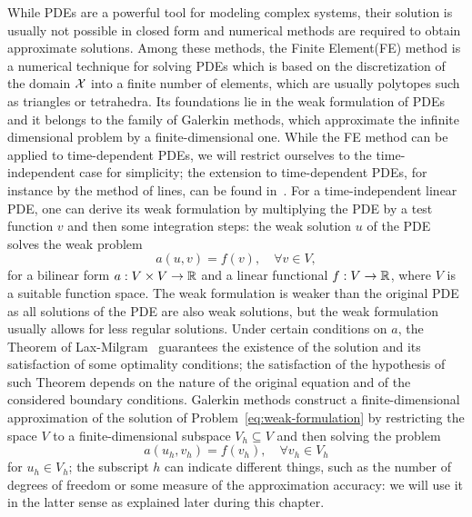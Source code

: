 While PDEs are a powerful tool for modeling complex systems, their solution is usually not possible in closed form and numerical methods are required to obtain approximate solutions.
Among these methods, the Finite Element(FE) method is a numerical technique for solving PDEs which is based on the discretization of the domain $\mathcal X$ into a finite number of elements, which are usually polytopes such as triangles or tetrahedra.
Its foundations lie in the weak formulation of PDEs and it belongs to the family of Galerkin methods, which approximate the infinite dimensional problem by a finite-dimensional one.
While the FE method can be applied to time-dependent PDEs, we will restrict ourselves to the time-independent case for simplicity; the extension to time-dependent PDEs, for instance by the method of lines, can be found in~\cite[Chapter 9]{DeuflhardWeiser2012}. \newline
For a time-independent linear PDE, one can derive its weak formulation by multiplying the PDE by a test function $v$ and then some integration steps: the weak solution $u$ of the PDE solves the weak problem 
\begin{equation}\label{eq:weak-formulation}
    a(u,v) = f(v), \quad \forall v \in V,
\end{equation}
for a bilinear form $a: V \times V \rightarrow \mathbb{R}$ and a linear functional $f: V \rightarrow \mathbb{R}$, where $V$ is a suitable function space.
The weak formulation is weaker than the original PDE as all solutions of the PDE are also weak solutions, but the weak formulation usually allows for less regular solutions.
Under certain conditions on $a$, the Theorem of Lax-Milgram~\cite{LaxMilgram1955} guarantees the existence of the solution and its satisfaction of some optimality conditions; the satisfaction of the hypothesis of such Theorem depends on the nature of the original equation and of the considered boundary conditions. \newline
Galerkin methods construct a finite-dimensional approximation of the solution of Problem~\eqref{eq:weak-formulation} by restricting the space $V$ to a finite-dimensional subspace $V_h \subseteq V$ and then solving the problem
\begin{equation*}
    a(u_h,v_h) = f(v_h), \quad \forall v_h \in V_h
\end{equation*} 
for $u_h \in V_h$; the subscript $h$ can indicate different things, such as the number of degrees of freedom or some measure of the approximation accuracy: we will use it in the latter sense as explained later during this chapter.
